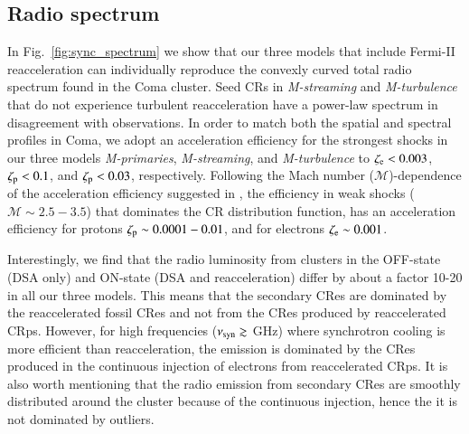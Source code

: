 \documentclass[fleqn,usenatbib,useAMS]{mnras}
\newcommand{\Mstream}{{\it M-streaming}\xspace}
\newcommand{\Mflatturb}{{\it M-turbulence}\xspace}
\newcommand{\Mprimary}{{\it M-primaries}\xspace}
\begin{document}
\subsection{Radio spectrum}
\label{sect:radio_spec}
In Fig.~\ref{fig:sync_spectrum} we show that our three models that
include Fermi-II reacceleration can individually reproduce the
convexly curved total radio spectrum found in the Coma cluster. Seed
CRs in \Mstream and \Mflatturb that do not experience turbulent
reacceleration have a power-law spectrum in disagreement with
observations. In order to match both the spatial and spectral profiles
in Coma, we adopt an acceleration efficiency for the strongest shocks
in our three models \Mprimary, \Mstream, and \Mflatturb to
$\zeta_{{\mathrm{e}}} <0.003$, $\zeta_{{\mathrm{p}}} < 0.1$, and
$\zeta_{{\mathrm{p}}}<0.03$, respectively. Following the Mach number
($\mathcal{M}$)-dependence of the acceleration efficiency suggested in
\cite{pinzke13}, the efficiency in weak shocks ($\mathcal{M}\sim
2.5-3.5$) that dominates the CR distribution function, has an
acceleration efficiency for protons $\zeta_{{\mathrm{p}}}\sim0.0001-0.01$,
and for electrons $\zeta_{{\mathrm{e}}}\sim 0.001$.

Interestingly, we find that the radio luminosity from clusters in the
OFF-state (DSA only) and ON-state (DSA and reacceleration) differ by
about a factor 10-20 in all our three models. This means that the
secondary CRes are dominated by the reaccelerated fossil CRes and not
from the CRes produced by reaccelerated CRps. However, for high
frequencies ($\nu_{\mathrm{syn}}\gtrsim$ GHz) where synchrotron cooling is
more efficient than reacceleration, the emission is dominated by the
CRes produced in the continuous injection of electrons from
reaccelerated CRps. It is also worth mentioning that the radio
emission from secondary CRes are smoothly distributed around the
cluster because of the continuous injection, hence the it is not
dominated by outliers.
\end{document}
